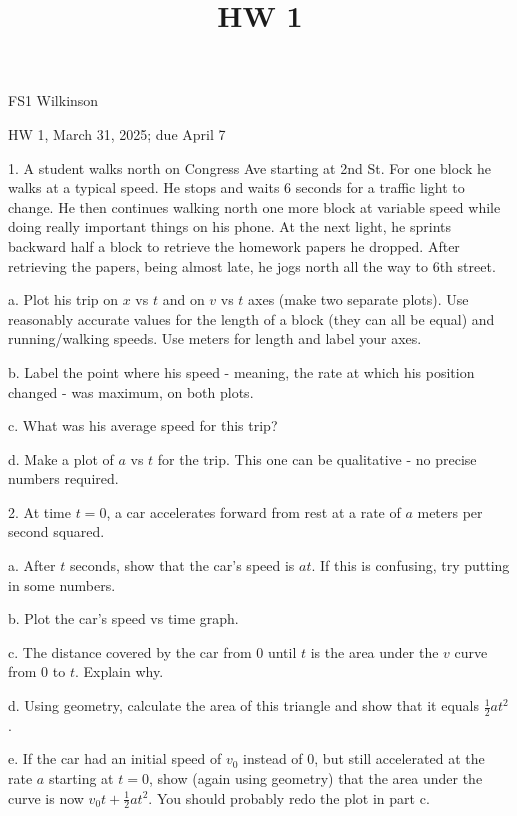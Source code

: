 \documentclass[12pt]{article}
\title{HW 1}
\begin{document}
\setlength{\parindent}{0pt}
\setlength{\parskip}{3mm}





FS1 Wilkinson

HW 1, March 31, 2025; due April 7


1. A student walks north on Congress Ave starting at 2nd St. For one block he walks at a typical speed. He stops and waits 6 seconds for a traffic light to change. He then continues walking north one more block at variable speed while doing really important things on his phone. At the next light, he sprints backward half a block to retrieve the homework papers he dropped. After retrieving the papers, being almost late, he jogs north all the way to 6th street. 

a. Plot his trip on $x$ vs $t$ and on $v$ vs $t$ axes (make two separate plots). Use reasonably accurate values for the length of a block (they can all be equal) and running/walking speeds. Use meters for length and label your axes.

b. Label the point where his speed - meaning, the rate at which his position changed - was maximum, on both plots.

c. What was his average speed for this trip?

d. Make a plot of $a$ vs $t$ for the trip. This one can be qualitative - no precise numbers required. 

\bigskip

\bigskip

\bigskip


2. At time $t=0$, a car accelerates forward from rest at a rate of $a$ meters per second squared. 

a. After $t$ seconds, show that the car's speed is $at$. If this is confusing, try putting in some numbers.

b. Plot the car's speed vs time graph. 

c. The distance covered by the car from 0 until $t$ is the area under the $v$ curve from 0 to $t$. Explain why.

d. Using geometry, calculate the area of this triangle and show that it equals $\frac{1}{2}at^2$.

e. If the car had an initial speed of $v_0$ instead of 0, but still accelerated at the rate $a$ starting at $t=0$, show (again using geometry) that the area under the curve is now $v_0t+\frac{1}{2}at^2.$ You should probably redo the plot in part c. 
\end{document}
